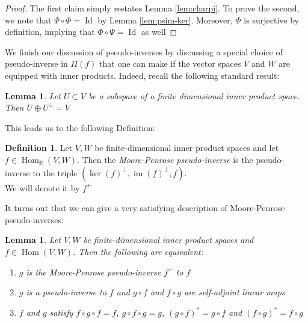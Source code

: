 \documentclass{book}
\theoremstyle{plain}
\newtheorem{lemma}[corollary]{Lemma}
\theoremstyle{definition}
\newtheorem{definition}[corollary]{Definition}
\renewcommand{\d}[1]{\mathbb{#1}}
\newcommand{\ds}{\oplus}
\DeclareMathOperator{\Hom}{Hom}
\DeclareMathOperator{\Id}{Id}
\DeclareMathOperator{\im}{im}
\begin{document}
\begin{proof}
	The first claim simply restates Lemma \ref{lem:charpi}. To prove the second, we note that $\Psi\circ \Phi=\Id$  by Lemma \ref{lem:psim-ker}. Moreover, $\Phi$ is surjective by definition, implying that $\Phi\circ \Psi =\Id$ as well
\end{proof}



\noindent We finish our discussion of pseudo-inverses by discussing a special choice of pseudo-inverse in $\Pi(f)$ that one can make if the vector spaces $V$ and $W$ are equipped with inner products. Indeed, recall the following standard result:

\begin{lemma}
 Let $U \subset V$ be a subspace of a finite dimensional inner product space. Then $U\ds U^{\perp}=V$
\end{lemma}

This leads us to the following Definition:
\begin{definition}\label{def:mpinverse}
Let $V,W$ be finite-dimensional inner product spaces and let $f \in \Hom_\d{R}(V,W)$. Then the \emph{Moore-Penrose pseudo-inverse} is the pseudo-inverse to the triple $(\ker(f)^\perp,\im(f)^\perp,f)$.\\ We will denote it by $f^+$
\end{definition}

\noindent It turns out that we can give a very satisfying description of Moore-Penrose pseudo-inverses:

\begin{lemma}\label{lem:mppschar}
	Let $V, W$ be finite-dimensional inner product spaces and $f \in \Hom(V,W)$. Then the following are equivalent:
	\begin{enumerate}
		\item $g$ is the Moore-Penrose pseudo-inverse $f^+$ to $f$
		\item $g$ is a pseudo-inverse to $f$ and $g\circ f$ and $f \circ g$ are self-adjoint linear maps
		\item $f$ and $g$ satisfy $f\circ g \circ f=f$, $g\circ f\circ g =g$,  $(g\circ f)^*=g\circ f$ and $(f\circ g)^* =f\circ g$
	\end{enumerate}
\end{lemma}
\end{document}
